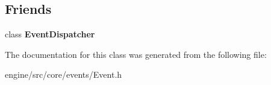 \subsection*{Friends}
\begin{DoxyCompactItemize}
\item
\mbox{\label{classengine_1_1events_1_1Event_aad5f38ccd490ea17008460423f52325a}}
class {\bfseries Event\+Dispatcher}
\end{DoxyCompactItemize}


The documentation for this class was generated from the following file\+:\begin{DoxyCompactItemize}
\item
engine/src/core/events/Event.\+h\end{DoxyCompactItemize}
